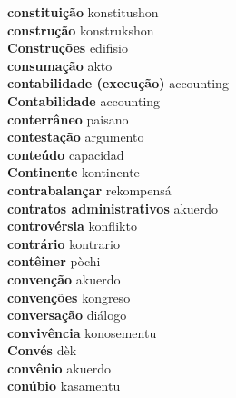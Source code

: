 \textbf{ constituição  } konstitushon \\
\textbf{ construção  } konstrukshon \\
\textbf{ Construções  } edifisio \\
\textbf{ consumação  } akto \\
\textbf{ contabilidade (execução)  } accounting \\
\textbf{ Contabilidade  } accounting \\
\textbf{ conterrâneo  } paisano \\
\textbf{ contestação  } argumento \\
\textbf{ conteúdo  } capacidad \\
\textbf{ Continente  } kontinente \\
\textbf{ contrabalançar  } rekompensá \\
\textbf{ contratos administrativos  } akuerdo \\
\textbf{ controvérsia  } konflikto \\
\textbf{ contrário  } kontrario \\
\textbf{ contêiner  } pòchi \\
\textbf{ convenção  } akuerdo \\
\textbf{ convenções  } kongreso \\
\textbf{ conversação  } diálogo \\
\textbf{ convivência  } konosementu \\
\textbf{ Convés  } dèk \\
\textbf{ convênio  } akuerdo \\
\textbf{ conúbio  } kasamentu \\
